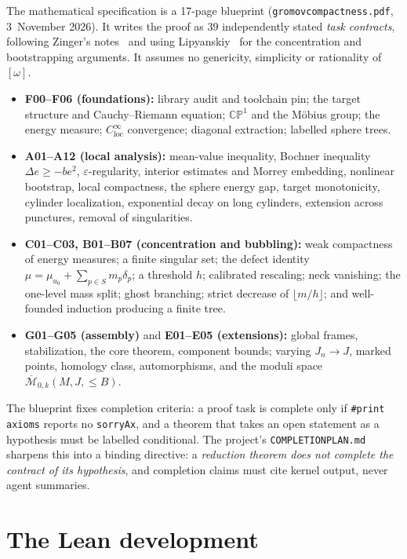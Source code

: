 \documentclass[11pt]{article}
\renewcommand{\_}{\origus\allowbreak}
\newcommand{\CP}{\mathbb{CP}^1}
\newcommand{\eps}{\varepsilon}
\newcommand{\code}[1]{\texttt{#1}}
\begin{document}
The mathematical specification is a 17-page blueprint (\code{gromov\_compactness.pdf}, 3~November
2026). It writes the proof as 39 independently stated \emph{task contracts}, following Zinger's
notes~\cite{Zinger} and using Lipyanskiy~\cite{Lipyanskiy} for the concentration and
bootstrapping arguments. It assumes no genericity, simplicity or rationality of $[\omega]$.
\begin{itemize}
\item \textbf{F00--F06 (foundations):} library audit and toolchain pin; the target structure and
  Cauchy--Riemann equation; $\CP$ and the M\"obius group; the energy measure; $C^\infty_{\mathrm{loc}}$
  convergence; diagonal extraction; labelled sphere trees.
\item \textbf{A01--A12 (local analysis):} mean-value inequality, Bochner inequality
  $\Delta e\ge -be^2$, $\eps$-regularity, interior estimates and Morrey embedding, nonlinear
  bootstrap, local compactness, the sphere energy gap, target monotonicity, cylinder localization,
  exponential decay on long cylinders, extension across punctures, removal of singularities.
\item \textbf{C01--C03, B01--B07 (concentration and bubbling):} weak compactness of energy
  measures; a finite singular set; the defect identity $\mu=\mu_{u_0}+\sum_{p\in S}m_p\delta_p$; a
  threshold $h$; calibrated rescaling; neck vanishing; the one-level mass split; ghost branching;
  strict decrease of $\lfloor m/h\rfloor$; and well-founded induction producing a finite tree.
\item \textbf{G01--G05 (assembly)} and \textbf{E01--E05 (extensions):} global frames,
  stabilization, the core theorem, component bounds; varying $J_n\to J$, marked points, homology
  class, automorphisms, and the moduli space $\overline{\mathcal M}_{0,k}(M,J,\le B)$.
\end{itemize}
The blueprint fixes completion criteria: a proof task is complete only if \code{\#print axioms}
reports no \code{sorryAx}, and a theorem that takes an open statement as a hypothesis must be
labelled conditional. The project's \code{COMPLETION\_PLAN.md} sharpens this into a binding
directive: a \emph{reduction theorem does not complete the contract of its hypothesis}, and
completion claims must cite kernel output, never agent summaries.

\section{The Lean development}
\end{document}

